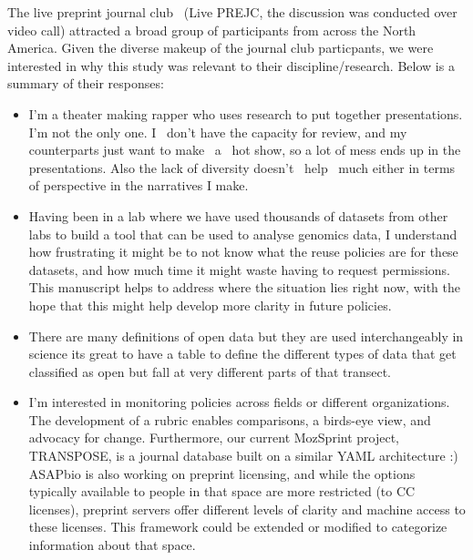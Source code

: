 \documentclass[10pt]{article}
\providecommand{\tightlist}{\setlength{\itemsep}{0pt}\setlength{\parskip}{0pt}}%
\begin{document}
\par\null

The live preprint journal club~ (Live PREJC, the discussion was
conducted over video call) attracted a broad group of participants from
across the North America. Given the diverse makeup of the journal club
particpants, we were interested in why this study was relevant to their
discipline/research. Below is a summary of their responses:

\par\null

\begin{itemize}
\tightlist
\item
  I'm a theater making rapper who uses research to put together
  presentations. I'm not the only one. I~ don't have the capacity for
  review, and my counterparts just want to make~ a~ hot show, so a lot
  of mess ends up in the presentations. Also the lack of diversity
  doesn't~ help~ much either in terms of perspective in the narratives I
  make.
\end{itemize}

\begin{itemize}
\tightlist
\item
  Having been in a lab where we have used thousands of datasets from
  other labs to build a tool that can be used to analyse genomics data,
  I understand how frustrating it might be to not know what the reuse
  policies are for these datasets, and how much time it might waste
  having to request permissions. This manuscript helps to address where
  the situation lies right now, with the hope that this might help
  develop more clarity in future policies.
\end{itemize}

\begin{itemize}
\tightlist
\item
  There are many definitions of open data but they are used
  interchangeably in science its great to have a table to define the
  different types of data that get classified as open but fall at very
  different parts of that transect.
\end{itemize}

\begin{itemize}
\tightlist
\item
  I'm interested in monitoring policies across fields or different
  organizations. The development of a rubric enables comparisons, a
  birds-eye view, and advocacy for change. Furthermore, our current
  MozSprint project, TRANSPOSE, is a journal database built on a similar
  YAML architecture :) ASAPbio is also working on preprint licensing,
  and while the options typically available to people in that space are
  more restricted (to CC licenses), preprint servers offer different
  levels of clarity and machine access to these licenses. This framework
  could be extended or modified to categorize information about that
  space.
\end{itemize}
\end{document}
